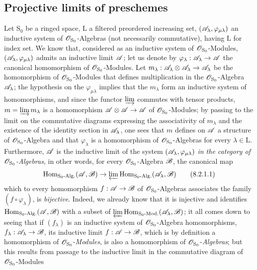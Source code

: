 \subsection{Projective limits of preschemes}
\label{subsection:IV.8.2}

\begin{env}[8.2.1]
\label{IV.8.2.1}
Let $\mathrm{S}_0$ be a ringed space, $\mathrm{L}$ a filtered preordered increasing set, $(\mathscr{A}_\lambda,\varphi_{\mu\lambda})$ an inductive system of $\mathscr{O}_{\mathrm{S}_0}$-Algebras (not necessarily commutative), having $\mathrm{L}$ for index set.
We know that, considered as an inductive system of $\mathscr{O}_{\mathrm{S}_0}$-Modules, $(\mathscr{A}_\lambda,\varphi_{\mu\lambda})$ admits an inductive limit $\mathscr{A}$; let us denote by $\varphi_\lambda:\mathscr{A}_\lambda\to\mathscr{A}$ the canonical homomorphism of $\mathscr{O}_{\mathrm{S}_0}$-Modules.
Let $m_\lambda:\mathscr{A}_\lambda\otimes\mathscr{A}_\lambda\to\mathscr{A}_\lambda$ be the homomorphism of $\mathscr{O}_{\mathrm{S}_0}$-Modules that defines multiplication in the $\mathscr{O}_{\mathrm{S}_0}$-Algebra $\mathscr{A}_\lambda$; the hypothesis on the $\varphi_{\mu\lambda}$ implies that the $m_\lambda$ form an inductive system of homomorphisms,
and since the functor $\varinjlim$ commutes with tensor products, $m=\varinjlim m_\lambda$ is a homomorphism $\mathscr{A}\otimes\mathscr{A}\to\mathscr{A}$ of $\mathscr{O}_{\mathrm{S}_0}$-Modules; by passing to the limit on the commutative diagrams expressing the associativity of $m_\lambda$ and the existence of the identity section in $\mathscr{A}_\lambda$, one sees that $m$ defines on $\mathscr{A}$ a structure of $\mathscr{O}_{\mathrm{S}_0}$-Algebra and that $\varphi_\lambda$ is a homomorphism of $\mathscr{O}_{\mathrm{S}_0}$-Algebras for every $\lambda\in\mathrm{L}$.
Furthermore, $\mathscr{A}$ is the inductive limit of the system $(\mathscr{A}_\lambda,\varphi_{\mu\lambda})$ \emph{in the category of $\mathscr{O}_{\mathrm{S}_0}$-Algebras}, in other words, for every $\mathscr{O}_{\mathrm{S}_0}$-Algebra $\mathscr{B}$, the canonical map
\begin{equation}
  \operatorname{Hom}_{\mathrm{S}_0\text{-}\mathrm{Alg.}}(\mathscr{A},\mathscr{B})\to\varprojlim\operatorname{Hom}_{\mathrm{S}_0\text{-}\mathrm{Alg.}}(\mathscr{A}_\lambda,\mathscr{B})
  \tag{8.2.1.1}
\label{IV.8.2.1.1}
\end{equation}
which to every homomorphism $f:\mathscr{A}\to\mathscr{B}$ of $\mathscr{O}_{\mathrm{S}_0}$-Algebras associates the family $(f\circ\varphi_\lambda)$, is \emph{bijective}.
Indeed, we already know that it is injective and identifies $\operatorname{Hom}_{\mathrm{S}_0\text{-}\mathrm{Alg.}}(\mathscr{A},\mathscr{B})$ with a subset of $\varprojlim\operatorname{Hom}_{\mathrm{S}_0\text{-}\mathrm{Mod.}}(\mathscr{A}_\lambda,\mathscr{B})$; it all comes down to seeing that if $(f_\lambda)$ is an inductive system of $\mathscr{O}_{\mathrm{S}_0}$-Algebra homomorphisms, $f_\lambda:\mathscr{A}_\lambda\to\mathscr{B}$, its inductive limit $f:\mathscr{A}\to\mathscr{B}$, which is by definition a homomorphism of $\mathscr{O}_{\mathrm{S}_0}$-\emph{Modules}, is also a homomorphism of $\mathscr{O}_{\mathrm{S}_0}$-\emph{Algebras}; but this results from passage to the inductive limit in the commutative diagram of $\mathscr{O}_{\mathrm{S}_0}$-Modules

\end{env}
